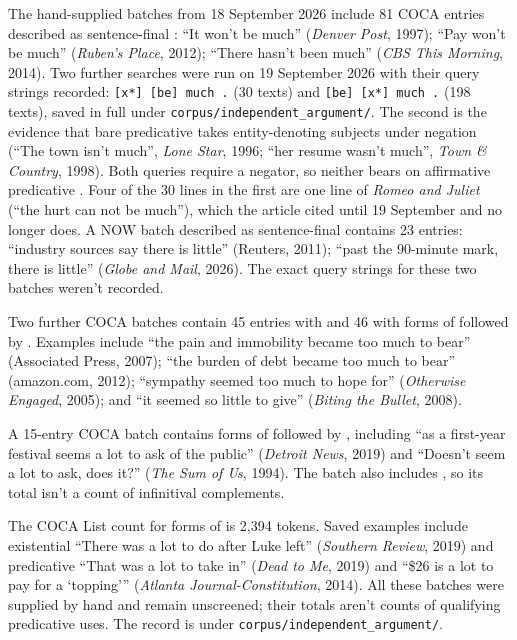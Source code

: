 \documentclass[12pt]{article}
\begin{document}
The hand-supplied batches from 18 September 2026 include 81 COCA entries described as sentence-final : \enquote{It won't be much} (\textit{Denver Post}, 1997); \enquote{Pay won't be much} (\textit{Ruben's Place}, 2012); \enquote{There hasn't been much} (\textit{CBS This Morning}, 2014). Two further searches were run on 19 September 2026 with their query strings recorded: \texttt{[x*] [be] much .} (30 texts) and \texttt{[be] [x*] much .} (198 texts), saved in full under \texttt{corpus/independent\_argument/}. The second is the evidence that bare predicative  takes entity-denoting subjects under negation (\enquote{The town isn't much}, \textit{Lone Star}, 1996; \enquote{her resume wasn't much}, \textit{Town \& Country}, 1998). Both queries require a negator, so neither bears on affirmative predicative . Four of the 30 lines in the first are one line of \textit{Romeo and Juliet} (\enquote{the hurt can not be much}), which the article cited until 19 September and no longer does. A NOW batch described as sentence-final  contains 23 entries: \enquote{industry sources say there is little} (Reuters, 2011); \enquote{past the 90-minute mark, there is little} (\textit{Globe and Mail}, 2026). The exact query strings for these two batches weren't recorded.

Two further COCA batches contain 45 entries with  and 46 with forms of  followed by . Examples include \enquote{the pain and immobility became too much to bear} (Associated Press, 2007); \enquote{the burden of debt became too much to bear} (amazon.com, 2012); \enquote{sympathy seemed too much to hope for} (\textit{Otherwise Engaged}, 2005); and \enquote{it seemed so little to give} (\textit{Biting the Bullet}, 2008).

A 15-entry COCA batch contains forms of  followed by , including \enquote{as a first-year festival seems a lot to ask of the public} (\textit{Detroit News}, 2019) and \enquote{Doesn't seem a lot to ask, does it?} (\textit{The Sum of Us}, 1994). The batch also includes , so its total isn't a count of infinitival complements.

The COCA List count for forms of  is 2,394 tokens. Saved examples include existential \enquote{There was a lot to do after Luke left} (\textit{Southern Review}, 2019) and predicative \enquote{That was a lot to take in} (\textit{Dead to Me}, 2019) and \enquote{\$26 is a lot to pay for a \enquote{topping}} (\textit{Atlanta Journal-Constitution}, 2014). All these batches were supplied by hand and remain unscreened; their totals aren't counts of qualifying predicative uses. The record is under \texttt{corpus/independent\_argument/}.
\end{document}
